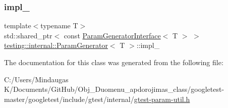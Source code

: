 \mbox{\label{classtesting_1_1internal_1_1_param_generator_a7bb352a2ce3f011b135eb5b69540f010}} 
\subsubsection{\texorpdfstring{impl\_}{impl\_}\hspace{0.1cm}{\footnotesize\ttfamily [2/2]}}
{\footnotesize\ttfamily template$<$typename T$>$ \\
std\+::shared\+\_\+ptr$<$ const \mbox{\hyperlink{classtesting_1_1internal_1_1_param_generator_interface}{Param\+Generator\+Interface}}$<$ T $>$ $>$ \mbox{\hyperlink{classtesting_1_1internal_1_1_param_generator}{testing\+::internal\+::\+Param\+Generator}}$<$ T $>$\+::impl\+\_\+\hspace{0.3cm}{\ttfamily [private]}}



The documentation for this class was generated from the following file\+:\begin{DoxyCompactItemize}
\item 
C\+:/\+Users/\+Mindaugas K/\+Documents/\+Git\+Hub/\+Obj\+\_\+\+Duomenu\+\_\+apdorojimas\+\_\+class/googletest-\/master/googletest/include/gtest/internal/\mbox{\hyperlink{googletest-master_2googletest_2include_2gtest_2internal_2gtest-param-util_8h}{gtest-\/param-\/util.\+h}}\end{DoxyCompactItemize}
